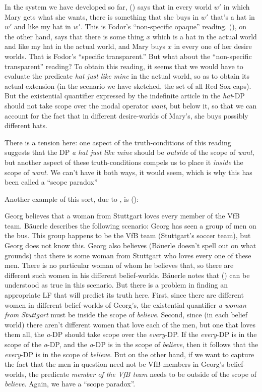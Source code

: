 In the system we have developed so far, (\blastx) says that in every world $w'$
in which Mary gets what she wants, there is something that she buys in $w'$
that's a hat in $w'$ and like my hat in $w'$. This is Fodor's ``non-specific
opaque'' reading. (\lastx), on the other hand, says that there is some thing $x$
which is a hat in the actual world and like my hat in the actual world, and Mary
buys $x$ in every one of her desire worlds. That is Fodor's ``specific
transparent.'' But what about the ``non-specific transparent'' reading? To
obtain this reading, it seems that we would have to evaluate the predicate
\emph{hat just like mine} in the actual world, so as to obtain its actual
extension (in the scenario we have sketched, the set of all Red Sox caps). But
the existential quantifier expressed by the indefinite article in the
\emph{hat}-DP should not take scope over the modal operator \emph{want}, but
below it, so that we can account for the fact that in different desire-worlds of
Mary's, she buys possibly different hats.

There is a tension here: one aspect of the truth-conditions of this reading
suggests that the DP \emph{a hat just like mine} should be \emph{outside} of the
scope of \emph{want}, but another aspect of these truth-conditions compels us to
place it \emph{inside} the scope of \emph{want}. We can't have it both ways, it
would seem, which is why this has been called a ``scope paradox''

Another example of this sort, due to \cite{bauerle-1983-nps}, is (\nextx):

\ex Georg believes that a woman from Stuttgart loves every member of the VfB
team. \xe
%
Bäuerle describes the following scenario: Georg has seen a group of men on the
bus. This group happens to be the VfB team (Stuttgart's soccer team), but Georg
does not know this. Georg also believes (Bäuerle doesn't spell out on what
grounds) that there is some woman from Stuttgart who loves every one of these
men. There is no particular woman of whom he believes that, so there are
different such women in his different belief-worlds. Bäuerle notes that (\lastx)
can be understood as true in this scenario. But there is a problem in finding an
appropriate LF that will predict its truth here. First, since there are
different women in different belief-worlds of Georg's, the existential
quantifier \emph{a woman from Stuttgart} must be inside the scope of
\emph{believe}. Second, since (in each belief world) there aren't different
women that love each of the men, but one that loves them all, the \emph{a}-DP
should take scope over the \emph{every}-DP. If the \emph{every}-DP is in the
scope of the \emph{a}-DP, and the \emph{a}-DP is in the scope of \emph{believe},
then it follows that the \emph{every}-DP is in the scope of \emph{believe}. But
on the other hand, if we want to capture the fact that the men in question need
not be VfB-members in Georg's belief-worlds, the predicate \emph{member of the
  VfB team} needs to be outside of the scope of \emph{believe}. Again, we have a
``scope paradox''.

